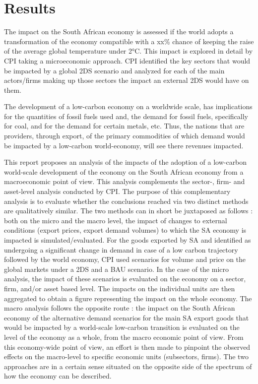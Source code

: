 \documentclass[12pt,english]{article}
\begin{document}
\section{Results}

The impact on the South African economy is assessed if the world adopts a transformation of the economy compatible with a xx\% chance of keeping the raise of the average global temperature under 2°C. This impact is explored in detail by CPI taking a microeconomic approach. CPI identified the key sectors that would be impacted by a global 2DS scenario and analyzed for each of the main actors/firms making up those sectors the impact an external 2DS would have on them. 

The development of a low-carbon economy on a worldwide scale, has implications for the quantities of fossil fuels used and, the demand for fossil fuels, specifically for coal, and for the demand for certain metals, etc. Thus, the nations that are providers, through export, of the primary commodities of which demand would be impacted by a low-carbon world-economy, will see there revenues impacted. 

This report proposes an analysis of the impacts of the adoption of a low-carbon  world-scale development of the economy on the South African economy from a macroeconomic point of view. This analysis complements the sector-, firm- and asset-level analysis conducted by CPI. The purpose of this complementary analysis is to evaluate whether the conclusions reached via two distinct methods are qualitatively similar. The two methods can in short be juxtaposed as follows : both on the micro and the macro level, the impact of changes to external conditions (export prices, export demand volumes) to which the SA economy is impacted is simulated/evaluated. For the goods exported by SA and identified as undergoing a significant change in demand in case of a low carbon trajectory followed by the world economy, CPI used scenarios for volume and price on the global markets under a 2DS and a BAU scenario. In the case of the micro analysis, the impact of these scenarios is evaluated on the economy on a sector, firm, and/or asset based level. The impacts on the individual units are then aggregated to obtain a figure representing the impact on the whole economy. The macro analysis follows the opposite route : the impact on the South African economy of the alternative demand scenarios for the main SA export goods that would be impacted by a world-scale low-carbon transition %
is evaluated on the level of the economy as a whole, from the macro economic point of view. From this economy-wide point of view, an effort is then made to pinpoint the observed effects on the macro-level to specific economic units (subsectors, firms). The two approaches are in a certain sense situated on the opposite side of the spectrum of how the economy can be described. 
\end{document}

